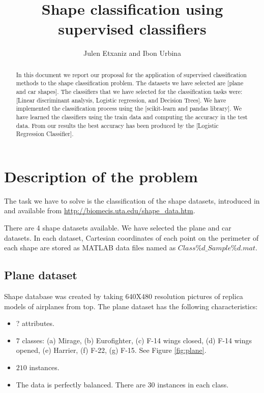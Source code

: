 \documentclass{article} %
\title{Shape classification using supervised classifiers}
\author{Julen Etxaniz and Ibon Urbina}
\begin{document}
\maketitle

\begin{abstract}
  In this document we report our proposal for the application of supervised classification methods to the shape classification problem. The datasets we have selected are [plane and car shapes]. The classifiers that we have selected for the classification tasks were: [Linear discriminant analysis, Logistic regression, and Decision Trees]. We have implemented the classification process using the [scikit-learn and pandas library]. We have learned the classifiers using the train data and computing the accuracy in the test data. From our results the best accuracy has been produced by the [Logistic Regression Classifier].
\end{abstract}

\tableofcontents
\newpage

\section{Description of the problem}
The task we have to solve is the classification of the shape datasets, introduced in \cite{Thakoor:2007} \cite{Thakoor:2005-July} \cite{Thakoor:2005-Oct} and available from \url{http://biomecis.uta.edu/shape_data.htm}. 
 
There are 4 shape datasets available. We have selected the plane and car datasets. In each dataset, Cartesian coordinates of each point on the perimeter of each shape are stored as MATLAB data files named as $Class\%d\_Sample\%d.mat$.

\subsection{Plane dataset}

Shape database was created by taking 640X480 resolution pictures of replica models of airplanes from top.
The plane dataset has the following characteristics:

\begin{itemize}
    \item ? attributes.
    \item $7$ classes: (a) Mirage, (b) Eurofighter, (c) F-14 wings closed, (d) F-14 wings opened, (e) Harrier, (f) F-22, (g) F-15. See Figure \ref{fig:plane}.
    \item $210$ instances. 
    \item The data is perfectly balanced. There are 30 instances in each class.
\end{itemize}
\end{document}
